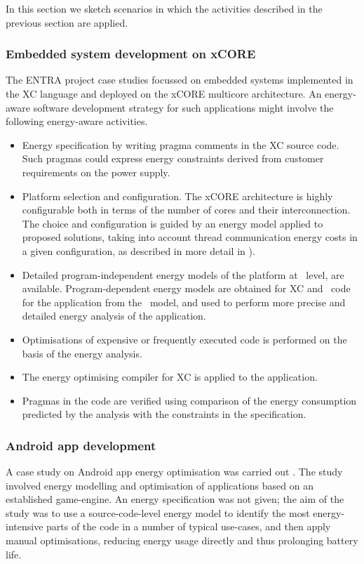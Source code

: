 \documentclass[11pt,oneside]{book}
\begin{document}
In this section we sketch scenarios in which the activities described
in the previous section are applied.

\subsubsection{Embedded system development on xCORE}\label{xcore-scenario}

The ENTRA project case studies focussed on embedded systems implemented in the XC language and deployed on the xCORE multicore architecture.  An energy-aware software development strategy for such applications might involve the following energy-aware activities.
\begin{itemize}
\item
Energy specification by writing pragma comments in the XC source code.  Such pragmas could express energy constraints derived from customer requirements on the power supply.
\item
Platform selection and configuration.  The xCORE architecture is highly configurable both in terms of the number of cores and their interconnection.  The choice and configuration is guided by an energy model applied to proposed solutions, taking into account thread communication energy costs in a given configuration, as described in more detail in \cite{KerrisonSwallow15}).
\item
Detailed program-independent energy models of the platform at \isa\ level, are available.  
Program-dependent energy models are obtained for XC and \llvmir\ code for the application from the \isa\ model, and used to perform more precise and detailed energy analysis of the application.
\item
Optimisations of expensive or frequently executed code is performed on the basis of the energy analysis.
\item
The energy optimising compiler for XC is applied to the application.
\item
Pragmas in the code are verified using comparison of the energy consumption predicted by the analysis with the constraints in the specification.  

\end{itemize}


\subsubsection{Android app development}\label{android-scenario}

A case study on Android app energy optimisation was carried out \cite{LiGallagher-TSE-2016}.  The study involved  energy modelling and optimisation of applications based on an established game-engine.  An energy specification was not given; the aim of the study was to use a source-code-level energy model to identify the most energy-intensive parts of the code in a number of typical use-cases, and then apply manual optimisations, reducing energy usage directly and thus prolonging battery life.
\end{document}
